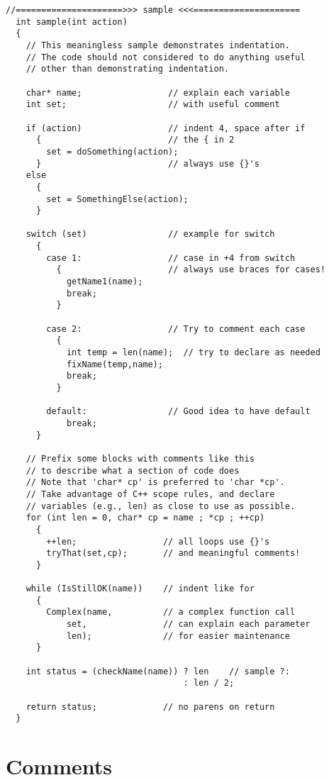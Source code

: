 \footnotesize
\begin{verbatim}
//=====================>>> sample <<<=====================
  int sample(int action)
  {
    // This meaningless sample demonstrates indentation.
    // The code should not considered to do anything useful
    // other than demonstrating indentation.

    char* name;                 // explain each variable
    int set;                    // with useful comment

    if (action)                 // indent 4, space after if
      {                         // the { in 2
        set = doSomething(action);
      }                         // always use {}'s
    else
      {
        set = SomethingElse(action);
      }

    switch (set)                // example for switch
      {
        case 1:                 // case in +4 from switch
          {                     // always use braces for cases!
            getName1(name); 
            break;
          }

        case 2:                 // Try to comment each case
          {
            int temp = len(name);  // try to declare as needed
            fixName(temp,name);
            break;
          }

        default:                // Good idea to have default
            break;
      }

    // Prefix some blocks with comments like this
    // to describe what a section of code does
    // Note that 'char* cp' is preferred to 'char *cp'.
    // Take advantage of C++ scope rules, and declare
    // variables (e.g., len) as close to use as possible.
    for (int len = 0, char* cp = name ; *cp ; ++cp)
      {
        ++len;                 // all loops use {}'s
        tryThat(set,cp);       // and meaningful comments!
      }

    while (IsStillOK(name))    // indent like for
      {
        Complex(name,          // a complex function call
            set,               // can explain each parameter
            len);              // for easier maintenance
      }

    int status = (checkName(name)) ? len    // sample ?:
                                   : len / 2;

    return status;             // no parens on return
  }
\end{verbatim}
\normalfont\normalsize

\section{Comments}

